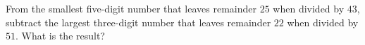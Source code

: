 From the smallest five-digit number that leaves remainder $25$ when divided by $43$, subtract the largest three-digit number that leaves remainder $22$ when divided by $51$. What is the result?
